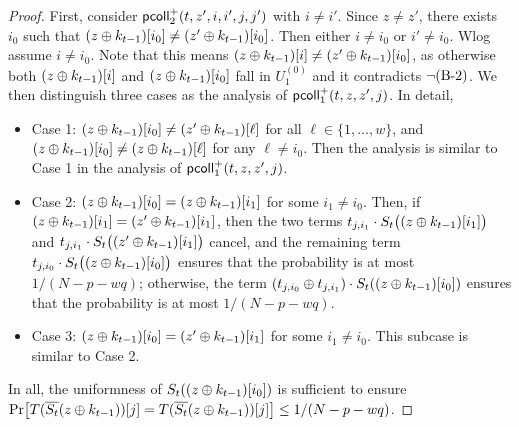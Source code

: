 \begin{proof}
	
	First, consider $\mathsf{pcoll}_{2}^+(t,z',i,i',j,j')$ with $i\neq i'$. Since $z\neq z'$, there exists $i_0$ such that $(z\oplus k_{t-1})[i_0]\neq(z'\oplus k_{t-1})[i_0]$. Then either $i\neq i_0$ or $i'\neq i_0$. Wlog assume $i\neq i_0$. Note that this means $(z\oplus k_{t-1})[i]\neq(z'\oplus k_{t-1})[i_0]$, as otherwise both $(z\oplus k_{t-1})[i]$ and $(z\oplus k_{t-1})[i_0]$ fall in $U_1^{(0)}$ and it contradicts $\neg\text{(B-2)}$. We then distinguish three cases as the analysis of $\mathsf{pcoll}_{1}^+(t,z,z',j)$. In detail,
	\begin{itemize}
		\item Case 1: $(z\oplus k_{t-1})[i_0]\neq(z'\oplus k_{t-1})[\ell]$ for all $\ell\in\{1,\ldots,w\}$, and $(z\oplus k_{t-1})[i_0]\neq(z\oplus k_{t-1})[\ell]$ for any $\ell\neq i_0$. Then the analysis is similar to Case 1 in the analysis of $\mathsf{pcoll}_{1}^+(t,z,z',j)$.
		\item Case 2: $(z\oplus k_{t-1})[i_0]=(z\oplus k_{t-1})[i_1]$ for some $i_1\neq i_0$. Then, if $(z\oplus k_{t-1})[i_1]=(z'\oplus k_{t-1})[i_1]$, then the two terms $t_{j,i_1}\cdot S_t\big((z\oplus k_{t-1})[i_1]\big)$ and $t_{j,i_1}\cdot S_t\big((z'\oplus k_{t-1})[i_1]\big)$ cancel, and the remaining term $t_{j,i_0}\cdot S_t\big((z\oplus k_{t-1})[i_0]\big)$ ensures that the probability is at most $1/(N-p-wq)$; otherwise, the term $(t_{j,i_0}\oplus t_{j,i_1})\cdot S_t((z\oplus k_{t-1})[i_0])$ ensures that the probability is at most $1/(N-p-wq)$.
		\item Case 3: $(z\oplus k_{t-1})[i_0]=(z'\oplus k_{t-1})[i_1]$ for some $i_1\neq i_0$. This subcase is similar to Case 2.
	\end{itemize}
	In all, the uniformness of $S_t((z\oplus k_{t-1})[i_0])$ is sufficient to ensure ${\Pr}\big[T(\overline{S_t}(z\oplus k_{t-1}))[j]=T(\overline{S_t}(z\oplus k_{t-1}))[j]\big]\leq1/(N-p-wq)$.
	
	
	
	\arrangespace
	

\end{proof}
